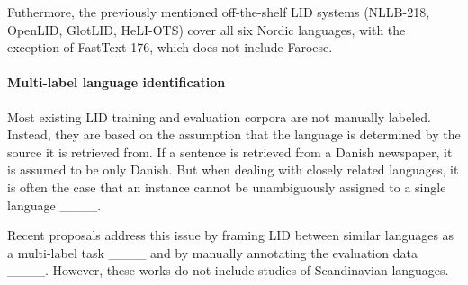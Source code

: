 Futhermore, the previously mentioned off-the-shelf LID systems (NLLB-218, OpenLID, GlotLID, HeLI-OTS) cover all six Nordic languages, with the exception of FastText-176, which does not include Faroese.


\paragraph{Multi-label language identification}

Most existing LID training and evaluation corpora are not manually labeled. Instead, they are based on the assumption that the language is determined by the source it is retrieved from. If a sentence is retrieved from a Danish newspaper, it is assumed to be only Danish. 
But when dealing with closely related languages, it is often the case that an instance cannot be unambiguously assigned to a single language ____.

Recent proposals address this issue by framing LID between similar languages as a multi-label task ____ and by manually annotating the evaluation data ____. However, these works do not include studies of Scandinavian languages.